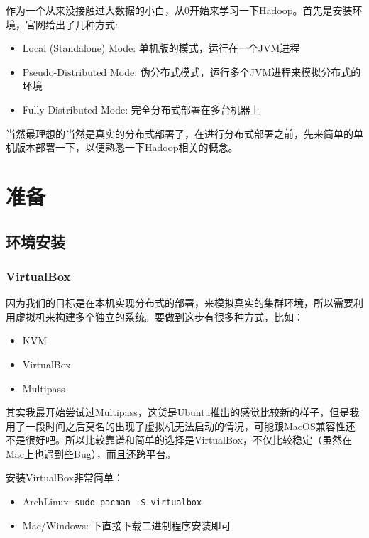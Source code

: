 \documentclass[12pt]{article}
\begin{document}
\makeblogtitle

作为一个从来没接触过大数据的小白，从0开始来学习一下Hadoop。首先是安装环境，官网给出了几种方式:

\begin{itemize}
\tightlist
\item
  Local (Standalone) Mode: 单机版的模式，运行在一个JVM进程
\item
  Pseudo-Distributed Mode: 伪分布式模式，运行多个JVM进程来模拟分布式的环境
\item
  Fully-Distributed Mode: 完全分布式部署在多台机器上
\end{itemize}

当然最理想的当然是真实的分布式部署了，在进行分布式部署之前，先来简单的单机版本部署一下，以便熟悉一下Hadoop相关的概念。

\section{准备}\label{ux51c6ux5907}

\subsection{环境安装}\label{ux73afux5883ux5b89ux88c5}

\subsubsection{VirtualBox}\label{virtualbox}

因为我们的目标是在本机实现分布式的部署，来模拟真实的集群环境，所以需要利用虚拟机来构建多个独立的系统。要做到这步有很多种方式，比如：

\begin{itemize}
\tightlist
\item
  KVM
\item
  VirtualBox
\item
  Multipass
\end{itemize}

其实我最开始尝试过Multipass，这货是Ubuntu推出的感觉比较新的样子，但是我用了一段时间之后莫名的出现了虚拟机无法启动的情况，可能跟MacOS兼容性还不是很好吧。所以比较靠谱和简单的选择是VirtualBox，不仅比较稳定（虽然在Mac上也遇到些Bug），而且还跨平台。

安装VirtualBox非常简单：

\begin{itemize}
\tightlist
\item
  ArchLinux: \texttt{sudo\ pacman\ -S\ virtualbox}
\item
  Mac/Windows: 下直接下载二进制程序安装即可
\end{itemize}
\end{document}
